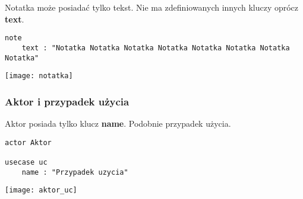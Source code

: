 Notatka może posiadać tylko tekst. Nie ma zdefiniowanych innych kluczy oprócz \textbf{text}.
\begin{lstlisting}
note 
    text : "Notatka Notatka Notatka Notatka Notatka Notatka Notatka Notatka"
\end{lstlisting}
\texttt{[image: notatka]}

\subsubsection{Aktor i przypadek użycia}

Aktor posiada tylko klucz \textbf{name}. Podobnie przypadek użycia.
\begin{lstlisting}
actor Aktor

usecase uc
    name : "Przypadek uzycia"
\end{lstlisting}
\texttt{[image: aktor\_uc]}